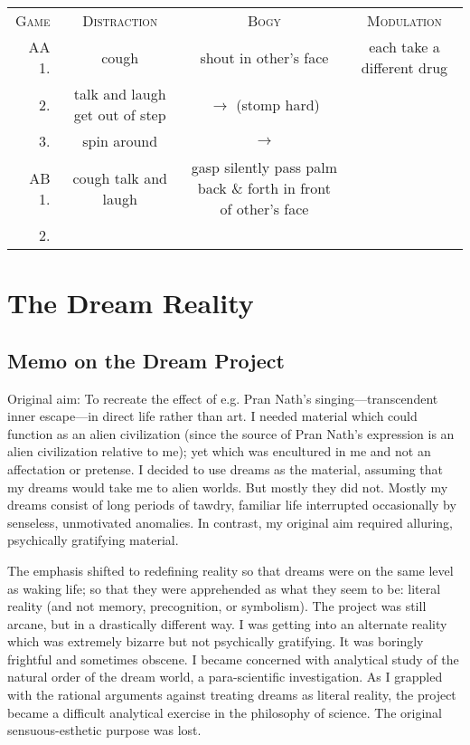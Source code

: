 \documentclass[10pt,twoside,draft]{memoir}
\begin{document}
{{\begin{tabular}{ r c c c }
	\textsc{Game} & \textsc{Distraction} & \textsc{Bogy} & \textsc{Modulation} \\
	AA 1. & cough & shout in other's face & each take a different drug \\
	2. & talk and laugh \linebreak get out of step & $\rightarrow$ \linebreak (stomp hard) & & \\
	3. & spin around & $\rightarrow$ & \\
	AB 1. & cough \linebreak talk and laugh & gasp \linebreak silently pass palm back \& forth in front of other's face & \\
	2. & & & \\
\end{tabular}


\chapter{The Dream Reality}


\section{Memo on the Dream Project}


Original aim: To recreate the effect of e.g. Pran Nath's singing---transcendent 
inner escape---in direct life rather than art. I needed material which could 
function as an alien civilization (since the source of Pran Nath's expression is 
an alien civilization relative to me); yet which was encultured in me and not 
an affectation or pretense. I decided to use dreams as the material, assuming 
that my dreams would take me to alien worlds. But mostly they did not. 
Mostly my dreams consist of long periods of tawdry, familiar life interrupted 
occasionally by senseless, unmotivated anomalies. In contrast, my original 
aim required alluring, psychically gratifying material. 

The emphasis shifted to redefining reality so that dreams were on the same 
level as waking life; so that they were apprehended as what they seem to be: 
literal reality (and not memory, precognition, or symbolism). The project 
was still arcane, but in a drastically different way. I was getting into an 
alternate reality which was extremely bizarre but not psychically gratifying. 
It was boringly frightful and sometimes obscene. I became concerned with 
analytical study of the natural order of the dream world, a para-scientific 
investigation. As I grappled with the rational arguments against treating 
dreams as literal reality, the project became a difficult analytical exercise in 
the philosophy of science. The original sensuous-esthetic purpose was lost. 

}}
\end{document}
